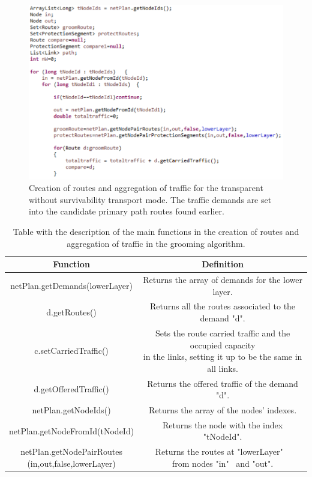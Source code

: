 \begin{figure}[H]
\centering
\includegraphics[width=14cm]{sdf/heuristic/transparent_survivability/figures/grooming_transparent_surv2}
\caption{Creation of routes and aggregation of traffic for the transparent without survivability transport mode. The traffic demands are set into the candidate primary path routes found earlier.}
\label{grooming_transparent_surv2}
\end{figure}

\begin{table}[H]
\centering
\begin{tabular}{|| c | c ||}
 \hline
 Function & Definition \\
 \hline\hline
 netPlan.getDemands(lowerLayer) & Returns the array of demands for the lower layer. \\
 \hline
 d.getRoutes() & Returns all the routes associated to the demand "d". \\
 \hline
 c.setCarriedTraffic() & \makecell{Sets the route carried traffic and the occupied capacity\\in the links, setting it up to be the same in all links.} \\
 \hline
 d.getOfferedTraffic() & Returns the offered traffic of the demand "d". \\
 \hline
 netPlan.getNodeIds() & Returns the array of the nodes' indexes. \\
 \hline
 netPlan.getNodeFromId(tNodeId) & Returns the node with the index "tNodeId". \\
 \hline
 \makecell{netPlan.getNodePairRoutes\\(in,out,false,lowerLayer)} &  \makecell{Returns the routes at "lowerLayer" \ \\from nodes "in" \ and "out".} \\
 \hline
\end{tabular}
\caption{Table with the description of the main functions in the creation of routes and aggregation of traffic in the grooming algorithm.}
\label{grooming_table_variables_transparent_surv}
\end{table}

